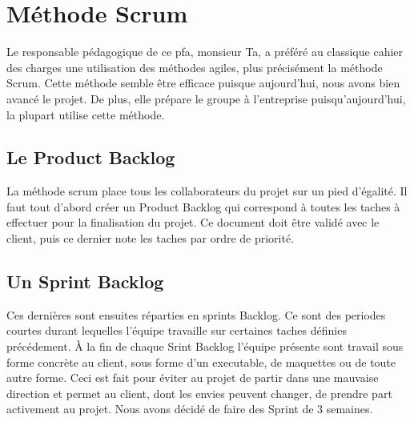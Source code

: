 \section{Méthode Scrum}
Le responsable pédagogique de ce pfa, monsieur Ta, a préféré au classique cahier des charges une utilisation des méthodes agiles, plus précisément la méthode Scrum.
Cette méthode semble être efficace puisque aujourd'hui, nous avons bien avancé le projet. De plus, elle prépare le groupe à l'entreprise puisqu'aujourd'hui, la plupart utilise cette méthode.

\subsection*{Le Product Backlog}
La méthode scrum place tous les collaborateurs du projet sur un pied d'égalité. Il faut tout d'abord créer un Product Backlog qui correspond à toutes les taches à effectuer pour la finalisation du projet.
Ce document doit être validé avec le client, puis ce dernier note les taches par ordre de priorité.

\subsection*{Un Sprint Backlog}
Ces dernières sont ensuites réparties en sprints Backlog. Ce sont des periodes courtes durant lequelles l'équipe travaille sur certaines taches définies précédement. 
À la fin de chaque Srint Backlog l'équipe présente sont travail sous forme concrète au client, sous forme d'un executable, de maquettes ou de toute autre forme.
Ceci est fait pour éviter au projet de partir dans une mauvaise direction et permet au client, dont les envies peuvent changer, de prendre part activement au projet.
Nous avons décidé de faire des Sprint de 3 semaines.

\subsection*{}


